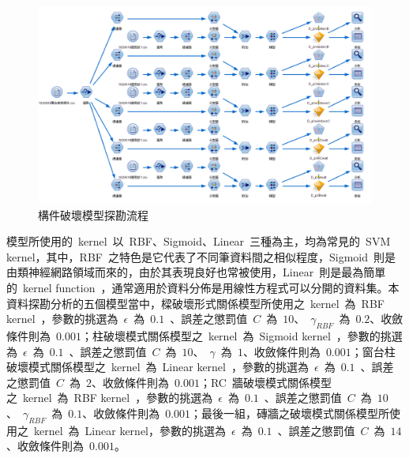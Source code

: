 \begin{figure}[hbtp]
  \begin{center}
    \includegraphics[width=1.0\textwidth]{figures/crack-flow.png}
    \caption{構件破壞模型探勘流程} 
    \label{fig:crack-flow}
  \end{center}
\end{figure}


模型所使用的~kernel~以~RBF、Sigmoid、Linear~三種為主，均為常見的~SVM kernel，其中，RBF~之特色是它代表了不同筆資料間之相似程度，Sigmoid~則是由類神經網路領域而來的，由於其表現良好也常被使用，Linear~則是最為簡單的~kernel function~，通常適用於資料分佈是用線性方程式可以分開的資料集。本資料探勘分析的五個模型當中，樑破壞形式關係模型所使用之~kernel~為~RBF kernel~，參數的挑選為~$\epsilon$~為~$0.1$~、誤差之懲罰值~$C$~為~$10$、~$\gamma_{RBF}$~為~$0.2$、收斂條件則為~$0.001$；柱破壞模式關係模型之~kernel~為~Sigmoid kernel~，參數的挑選為~$\epsilon$~為~$0.1$~、誤差之懲罰值~$C$~為~$10$、~$\gamma$~為~$1$、收斂條件則為~$0.001$；窗台柱破壞模式關係模型之~kernel~為~Linear kernel~，參數的挑選為~$\epsilon$~為~$0.1$~、誤差之懲罰值~$C$~為~$2$、收斂條件則為~$0.001$；RC~牆破壞模式關係模型之~kernel~為~RBF kernel~，參數的挑選為~$\epsilon$~為~$0.1$~、誤差之懲罰值~$C$~為~$10$、~$\gamma_{RBF}$~為~$0.1$、收斂條件則為~$0.001$；最後一組，磚牆之破壞模式關係模型所使用之~kernel~為~Linear kernel，參數的挑選為~$\epsilon$~為~$0.1$~、誤差之懲罰值~$C$~為~$14$、收斂條件則為~$0.001$。





